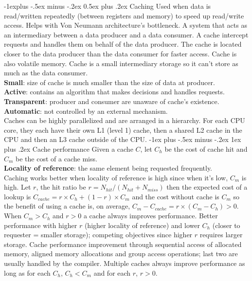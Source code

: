 \documentclass[10pt,landscape]{article}
\makeatletter
\renewcommand{\subsection}{\@startsection{subsection}{2}{0mm}%
                                {-1explus -.5ex minus -.2ex}%
                                {0.5ex plus .2ex}%
                                {\normalfont\scriptsize\bfseries}}
\renewcommand{\subsubsection}{\@startsection{subsubsection}{3}{0mm}%
                                {-1ex plus -.5ex minus -.2ex}%
                                {1ex plus .2ex}%
                                {\normalfont\tiny\bfseries}}
\makeatother
\begin{document}
\begin{multicols}{3}
\subsection{Caching}
Used when data is read/written repeatedly (between registers and memory) to speed up read/write access. Helps with Von Neumann architecture's bottleneck. A system that acts as an intermediary between a data producer and a data consumer. A cache intercept requests and handles them on behalf of the data producer. The cache is located closer to the data producer than the data consumer for faster access. Cache is also volatile memory. Cache is a small intermediary storage so it can't store as much as the data consumer.\\
\textbf{Small}: size of cache is much smaller than the size of data at producer.\\
\textbf{Active}: contains an algorithm that makes decisions and handles requests.\\
\textbf{Transparent}: producer and consumer are unaware of cache's existence.\\
\textbf{Automatic}: not controlled by an external mechanism.\\
Caches can be highly parallelized and are arranged in a hierarchy. For each CPU core, they each have their own L1 (level 1) cache, then a shared L2 cache in the CPU and then an L3 cache outside of the CPU. 
\subsubsection{Cache performance}
Given a cache $C$, let $C_h$ be the cost of cache hit and $C_m$ be the cost of a cache miss.\\ 
\textbf{Locality of reference}: the same element being requested frequently.\\
Caching works better when locality of reference is high since when it's low, $C_m$ is high. Let $r$, the hit ratio be $r=N_{hit} / (N_{hit} + N_{miss})$ then the expected cost of a lookup is $C_{cache}=r\times C_h+(1-r)\times C_m$ and the cost without cache is $C_m$ so the benefit of using a cache is, on average, $C_m-C_{cache}=r\times (C_m-C_h) > 0$. When $C_m > C_h$ and $r>0$ a cache always improves performance. Better performance with higher $r$ (higher locality of reference) and lower $C_h$ (closer to requester = smaller storage); competing objectives since higher $r$ requires larger storage. Cache performance improvement through sequential access of allocated memory, aligned memory allocations and group access operations; last two are usually handled by the compiler. Multiple caches always improve performance as long as for each $C_h$, $C_h<C_m$ and for each $r$, $r > 0$. 

\end{multicols}
\end{document}
